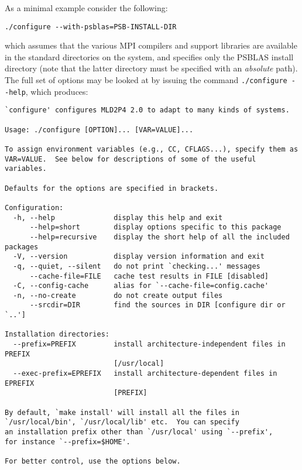 As a minimal example consider the following:
\begin{verbatim}
./configure --with-psblas=PSB-INSTALL-DIR
\end{verbatim}
which assumes that the various MPI compilers and support libraries are
available in the standard directories on the system, and specifies
only the PSBLAS install  directory (note that the latter directory must
be specified with an {\em absolute} path).
The full set of options may be looked at by issuing the command
\verb|./configure --help|, which produces:
\begin{verbatim}
`configure' configures MLD2P4 2.0 to adapt to many kinds of systems.

Usage: ./configure [OPTION]... [VAR=VALUE]...

To assign environment variables (e.g., CC, CFLAGS...), specify them as
VAR=VALUE.  See below for descriptions of some of the useful variables.

Defaults for the options are specified in brackets.

Configuration:
  -h, --help              display this help and exit
      --help=short        display options specific to this package
      --help=recursive    display the short help of all the included packages
  -V, --version           display version information and exit
  -q, --quiet, --silent   do not print `checking...' messages
      --cache-file=FILE   cache test results in FILE [disabled]
  -C, --config-cache      alias for `--cache-file=config.cache'
  -n, --no-create         do not create output files
      --srcdir=DIR        find the sources in DIR [configure dir or `..']

Installation directories:
  --prefix=PREFIX         install architecture-independent files in PREFIX
                          [/usr/local]
  --exec-prefix=EPREFIX   install architecture-dependent files in EPREFIX
                          [PREFIX]

By default, `make install' will install all the files in
`/usr/local/bin', `/usr/local/lib' etc.  You can specify
an installation prefix other than `/usr/local' using `--prefix',
for instance `--prefix=$HOME'.

For better control, use the options below.


\end{verbatim}
